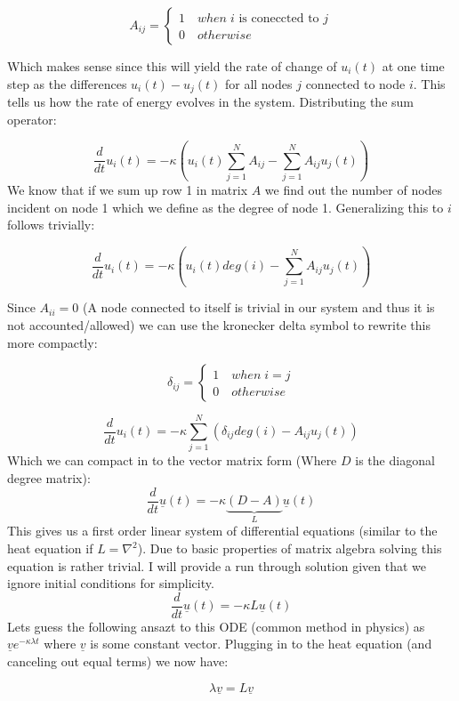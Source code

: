 \documentclass[10pt,twocolumn]{article}
\begin{document}
\[ A_{ij} = \begin{cases} 
   1 \quad when \; i \text{ is coneccted to } j \\
   0 \quad otherwise 
   \end{cases}
\]

Which makes sense since this will yield the rate of change of $u_{i}(t)$ at one time step as the differences $u_{i}(t) - u_{j}(t)$ for all nodes $j$ connected to node $i$. This tells us how the rate of energy evolves in the system.
\newline
Distributing the sum operator:

\[
\frac{d}{dt}u_{i}(t) = -\kappa \left( u_{i}(t) \sum_{j=1}^{N}A_{ij}-  \sum_{j=1}^{N}A_{ij}u_{j}(t) \right )
\]
We know that if we sum up row 1 in matrix $A$ we find out the number of nodes incident on node 1 which we define as the degree of node 1. Generalizing this to $i$ follows trivially:

\[
\frac{d}{dt}u_{i}(t) = -\kappa \left( u_{i}(t) deg(i)-  \sum_{j=1}^{N}A_{ij}u_{j}(t) \right )
\]

Since $A_{ii}=0$  (A node connected to itself is trivial in our system and thus it is not accounted/allowed) we can use the kronecker delta symbol to rewrite this more compactly:

\[ \delta_{ij} = \begin{cases} 
   1 \quad when \; i = j \\
   0 \quad otherwise 
   \end{cases}
\]

\[
\frac{d}{dt}u_{i}(t) = -\kappa \sum_{j=1}^{N}(\delta_{ij} deg(i) -A_{ij}u_{j}(t))
\]
Which we can compact in to the vector matrix form (Where $D$ is the diagonal degree matrix):
\[
\frac{d}{dt}\underline{u}(t) = -\kappa\underbrace{(D -A)}_{L}\underline{u}(t)
\]
This gives us a first order linear system of differential equations (similar to the heat equation if $L = \nabla^{2}$). Due to basic properties of matrix algebra solving this equation is rather trivial. I will provide a run through solution given that we ignore initial conditions for simplicity.
\[
\frac{d}{dt}\underline{u}(t) = -\kappa L\underline{u}(t)
\]
Lets guess the following ansazt to this ODE (common method in physics) as $\underline{v}e^{-\kappa\lambda t}$ where $\underline{v}$ is some constant vector. Plugging in to the heat equation (and canceling out equal terms) we now have:

\[
 \lambda \underline{v} = L \underline{v}
\]
\end{document}
